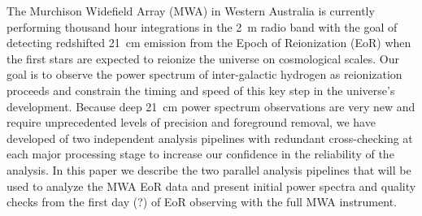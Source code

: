 The Murchison Widefield Array (MWA) in Western Australia is currently
performing thousand hour integrations in the 2~m radio band with the goal of
detecting redshifted 21~cm emission from the Epoch of Reionization
(EoR) when the first stars are expected to reionize the
universe on cosmological scales. Our goal is to observe the power spectrum of inter-galactic hydrogen as reionization
proceeds and constrain the timing and speed of this key step in the universe’s development. Because deep 21~cm power spectrum observations are very new and require unprecedented levels of precision and foreground removal, we have developed of two independent analysis pipelines with redundant cross-checking at each major processing stage to increase our confidence in the reliability of the analysis. In this paper we describe the two parallel analysis pipelines that will be used to analyze the MWA EoR data and present initial power spectra and quality checks from the first day (?) of EoR observing with the full MWA instrument.